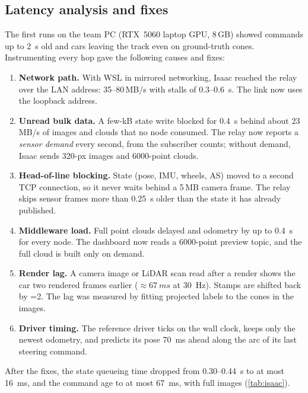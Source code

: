 \documentclass[11pt]{article}
\begin{document}
\subsection{Latency analysis and fixes}
The first runs on the team PC (RTX~5060 laptop GPU, 8\,GB) showed commands up to \SI{2}{s} old and cars leaving the
track even on ground-truth cones. Instrumenting every hop gave the following causes and fixes:
\begin{enumerate}
  \item \textbf{Network path.} With WSL in mirrored networking, Isaac reached the relay over the LAN address:
        35--80\,MB/s with stalls of 0.3--\SI{0.6}{s}. The link now uses the loopback address.
  \item \textbf{Unread bulk data.} A few-kB state write blocked for \SI{0.4}{s} behind about 23\,MB/s of images
        and clouds that no node consumed. The relay now reports a \emph{sensor demand} every second, from the
        subscriber counts; without demand, Isaac sends 320-px images and 6000-point clouds.
  \item \textbf{Head-of-line blocking.} State (pose, IMU, wheels, AS) moved to a second TCP connection, so it never
        waits behind a 5\,MB camera frame. The relay skips sensor frames more than \SI{0.25}{s} older than the state
        it has already published.
  \item \textbf{Middleware load.} Full point clouds delayed  and odometry by up to \SI{0.4}{s} for
        every node. The dashboard now reads a 6000-point preview topic, and the full cloud is built only on demand.
  \item \textbf{Render lag.} A camera image or LiDAR scan read after a render shows the car two rendered frames
        earlier ($\approx\SI{67}{ms}$ at \SI{30}{Hz}). Stamps are shifted back by =2. The lag was
        measured by fitting projected labels to the cones in the images.
  \item \textbf{Driver timing.} The reference driver ticks on the wall clock, keeps only the newest odometry, and
        predicts its pose \SI{70}{ms} ahead along the arc of its last steering command.
\end{enumerate}
After the fixes, the state queueing time dropped from 0.30--\SI{0.44}{s} to at most \SI{16}{ms}, and the command age
to at most \SI{67}{ms}, with full images (\cref{tab:isaac}).
\end{document}
